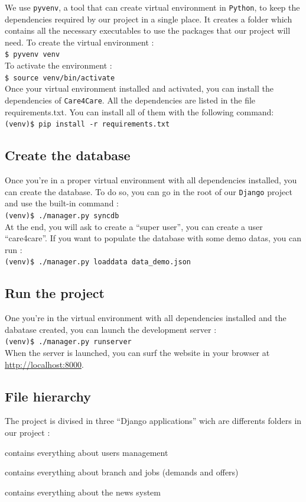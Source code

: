 \documentclass[11pt, a4paper]{article}      %
\newcommand{\shellcmd}[1]{\\\indent\indent\texttt{\footnotesize\$ #1}\\}
\newcommand{\vshellcmd}[1]{\\\indent\indent\texttt{\footnotesize(venv)\$ #1}\\}
\begin{document}
We use \texttt{pyvenv}, a tool that can create virtual environment in \texttt{Python}, to keep the dependencies required by our project in a single place. It creates a folder which contains all the necessary executables to use the packages that our project will need. To create the virtual environment :
\shellcmd{pyvenv venv}
To activate the environment :
\shellcmd{source venv/bin/activate}
Once your virtual environment installed and activated, you can install the dependencies of \texttt{Care4Care}. All the dependencies are listed in the file requirements.txt. You can install all of them with the following command:
\vshellcmd{pip install -r requirements.txt}

\subsection{Create the database}
Once you're in a proper virtual environment with all dependencies installed, you can create the database. To do so, you can go in the root of our \texttt{Django} project and use the built-in command :
\vshellcmd{./manager.py syncdb}
At the end, you will ask to create a ``super user'', you can create a user ``care4care''. If you want to populate the database with some demo datas, you can run :
\vshellcmd{./manager.py loaddata data\_demo.json}

\subsection{Run the project}
One you're in the virtual environment with all dependencies installed and the dabatase created, you can launch the development server :
\vshellcmd{./manager.py runserver}
When the server is launched, you can surf the website in your browser at \url{http://localhost:8000}. 

\subsection{File hierarchy}
The project is divised in three ``Django applications'' wich are differents folders in our project :
\begin{description}[noitemsep]
\item[- main] contains everything about users management
\item[- branch] contains everything about branch and jobs (demands and offers)
\item[- news] contains everything about the news system
\end{description}
\end{document}
